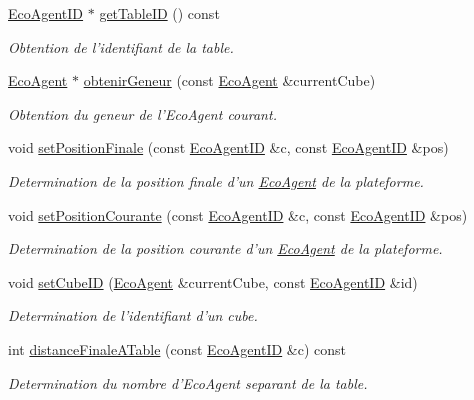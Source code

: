 \begin{CompactItemize}
\hyperlink{classEcoAgentID}{EcoAgentID} $\ast$ \hyperlink{classPlateformeMondeDesCubes_232d0a6c6cbd1bc2d8622fa92dd64ce1}{getTableID} () const 
\begin{CompactList}\small\item\em Obtention de l'identifiant de la table. \item\end{CompactList}\item 
\hyperlink{classEcoAgent}{EcoAgent} $\ast$ \hyperlink{classPlateformeMondeDesCubes_fd0d16680115dc57d5a43f433dde3592}{obtenirGeneur} (const \hyperlink{classEcoAgent}{EcoAgent} \&currentCube)
\begin{CompactList}\small\item\em Obtention du geneur de l'EcoAgent courant. \item\end{CompactList}\item 
void \hyperlink{classPlateformeMondeDesCubes_315f30b3c7c1e8bc9ec828a66a5813e5}{setPositionFinale} (const \hyperlink{classEcoAgentID}{EcoAgentID} \&c, const \hyperlink{classEcoAgentID}{EcoAgentID} \&pos)
\begin{CompactList}\small\item\em Determination de la position finale d'un \hyperlink{classEcoAgent}{EcoAgent} de la plateforme. \item\end{CompactList}\item 
void \hyperlink{classPlateformeMondeDesCubes_ecc518787fb8231be37e7b8eb3c5390e}{setPositionCourante} (const \hyperlink{classEcoAgentID}{EcoAgentID} \&c, const \hyperlink{classEcoAgentID}{EcoAgentID} \&pos)
\begin{CompactList}\small\item\em Determination de la position courante d'un \hyperlink{classEcoAgent}{EcoAgent} de la plateforme. \item\end{CompactList}\item 
void \hyperlink{classPlateformeMondeDesCubes_c99c6db4dfc2b193d8697103bec3d4d4}{setCubeID} (\hyperlink{classEcoAgent}{EcoAgent} \&currentCube, const \hyperlink{classEcoAgentID}{EcoAgentID} \&id)
\begin{CompactList}\small\item\em Determination de l'identifiant d'un cube. \item\end{CompactList}\item 
int \hyperlink{classPlateformeMondeDesCubes_7f694f86cf4a9502cf6bba2d6eb5a371}{distanceFinaleATable} (const \hyperlink{classEcoAgentID}{EcoAgentID} \&c) const 
\begin{CompactList}\small\item\em Determination du nombre d'EcoAgent separant de la table. \item\end{CompactList}\end{CompactItemize}
